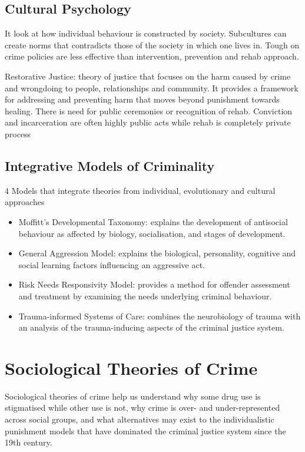 \documentclass[11pt]{article}
\begin{document}
\subsection{Cultural Psychology}

It look at how individual behaviour is constructed by society. Subcultures can create norms that contradicts those of the society in which one lives in. Tough on crime policies are less effective than intervention, prevention and rehab approach.

Restorative Justice: theory of justice that focuses on the harm caused by crime and wrongdoing to people, relationships and community. It provides a framework for addressing and preventing harm that moves beyond punishment towards healing. There is need for public ceremonies or recognition of rehab. Conviction and incarceration are often highly public acts while rehab is completely private process

\subsection{Integrative Models of Criminality}
4 Models that integrate theories from individual, evolutionary and cultural approaches

\begin{itemize}
    \item Moffitt’s Developmental Taxonomy: explains the development of antisocial behaviour as affected by biology, socialisation, and stages of development. 
    \item General Aggression Model: explains the biological, personality, cognitive and social learning factors influencing an aggressive act. 
    \item Risk Needs Responsivity Model: provides a method for offender assessment and treatment by examining the needs underlying criminal behaviour. 
    \item Trauma-informed Systems of Care: combines the neurobiology of trauma with an analysis of the trauma-inducing aspects of the criminal justice system.
\end{itemize}

\section{Sociological Theories of Crime}

Sociological theories of crime help us understand why some drug use is stigmatised while other use is not, why crime is over- and under-represented across social groups, and what alternatives may exist to the individualistic punishment models that have dominated the criminal justice system since the 19th century.
\end{document}
